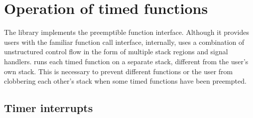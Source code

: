 \section{Operation of timed functions}
\label{sec:libinger}

%
%
%
%

The \libinger{} library implements the preemptible function interface. Although
it provides users with the familiar function call interface, internally,
\libinger{} uses a combination of unstructured control flow in the form of
multiple stack regions and signal handlers. \libinger{} runs each timed
function on a separate stack, different from the user's own stack. This is
necessary to prevent different functions or the user from clobbering each
other's stack when some timed functions have been preempted.

\subsection{Timer interrupts}


